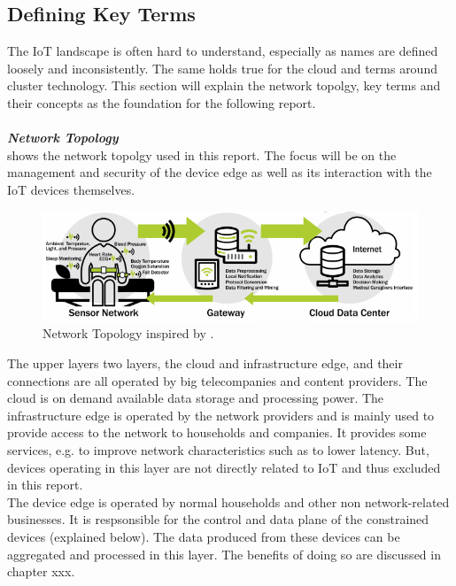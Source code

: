 \subsection{Defining Key Terms}
The IoT landscape is often hard to understand, especially as names are defined loosely and  inconsistently. The same holds true for the cloud and terms around cluster technology. This section will explain the network topolgy, key terms and their concepts as the foundation for the following report.\\
\vspace{0.5mm} \ \\
\textbf{\textit{Network Topology}}\\
 shows the network topolgy used in this report. The focus will be on the management and security of the device edge as well as its interaction with the IoT devices themselves. 
\begin{figure}[h!]
    \centering
    \includegraphics[scale=1.8]{figures/iotSetup.png}
    \caption{Network Topology inspired by \cite{iotGatewaySlavesGraph}.}
    \label{fig:netowrkTopology}
\end{figure}
The upper layers two layers, the cloud and infrastructure edge, and their connections are all operated by big telecompanies and content providers. The cloud is on demand available data storage and processing power. The infrastructure edge is operated by the network providers and is mainly used to provide access to the network to households and companies. It provides some services, e.g. to improve network characteristics such as to lower latency. But, devices operating in this layer are not directly related to IoT and thus excluded in this report.\\
The device edge is operated by normal households and other non network-related businesses. It is respsonsible for the control and data plane of the constrained devices (explained below). The data produced from these devices can be aggregated and processed in this layer. The benefits of doing so are discussed in chapter xxx.

